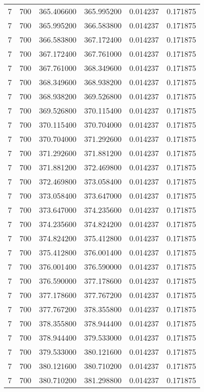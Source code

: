 \begin{longtable}{rrrrrr}
7 & 700 & 365.406600 & 365.995200 & 0.014237 & 0.171875 \\
7 & 700 & 365.995200 & 366.583800 & 0.014237 & 0.171875 \\
7 & 700 & 366.583800 & 367.172400 & 0.014237 & 0.171875 \\
7 & 700 & 367.172400 & 367.761000 & 0.014237 & 0.171875 \\
7 & 700 & 367.761000 & 368.349600 & 0.014237 & 0.171875 \\
7 & 700 & 368.349600 & 368.938200 & 0.014237 & 0.171875 \\
7 & 700 & 368.938200 & 369.526800 & 0.014237 & 0.171875 \\
7 & 700 & 369.526800 & 370.115400 & 0.014237 & 0.171875 \\
7 & 700 & 370.115400 & 370.704000 & 0.014237 & 0.171875 \\
7 & 700 & 370.704000 & 371.292600 & 0.014237 & 0.171875 \\
7 & 700 & 371.292600 & 371.881200 & 0.014237 & 0.171875 \\
7 & 700 & 371.881200 & 372.469800 & 0.014237 & 0.171875 \\
7 & 700 & 372.469800 & 373.058400 & 0.014237 & 0.171875 \\
7 & 700 & 373.058400 & 373.647000 & 0.014237 & 0.171875 \\
7 & 700 & 373.647000 & 374.235600 & 0.014237 & 0.171875 \\
7 & 700 & 374.235600 & 374.824200 & 0.014237 & 0.171875 \\
7 & 700 & 374.824200 & 375.412800 & 0.014237 & 0.171875 \\
7 & 700 & 375.412800 & 376.001400 & 0.014237 & 0.171875 \\
7 & 700 & 376.001400 & 376.590000 & 0.014237 & 0.171875 \\
7 & 700 & 376.590000 & 377.178600 & 0.014237 & 0.171875 \\
7 & 700 & 377.178600 & 377.767200 & 0.014237 & 0.171875 \\
7 & 700 & 377.767200 & 378.355800 & 0.014237 & 0.171875 \\
7 & 700 & 378.355800 & 378.944400 & 0.014237 & 0.171875 \\
7 & 700 & 378.944400 & 379.533000 & 0.014237 & 0.171875 \\
7 & 700 & 379.533000 & 380.121600 & 0.014237 & 0.171875 \\
7 & 700 & 380.121600 & 380.710200 & 0.014237 & 0.171875 \\
7 & 700 & 380.710200 & 381.298800 & 0.014237 & 0.171875 \\

\end{longtable}

